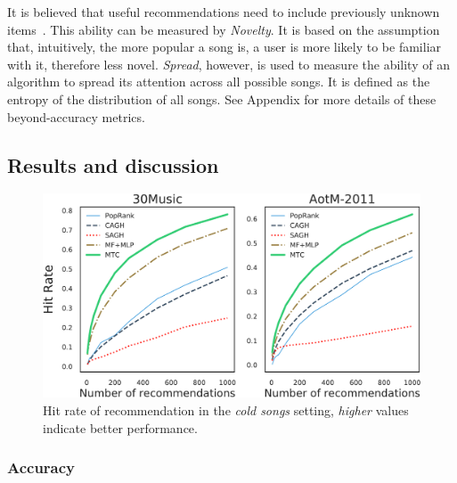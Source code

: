 It is believed that
useful recommendations need to include previously unknown items~\cite{herlocker2004evaluating,zhang2012auralist}.
This ability can be measured by \emph{Novelty}.
It is based on the assumption that, intuitively, the more popular a song is, 
a user is more likely to be familiar with it, therefore less novel.
%
\emph{Spread}, however, is used to measure the ability of an algorithm to spread its attention across all possible songs.
It is defined as the entropy of the distribution of all songs.
See Appendix for more details of these beyond-accuracy metrics.


\subsection{Results and discussion}

\begin{figure}[!t]
    \centering
    \includegraphics[width=\columnwidth]{fig/hr1.pdf}
    \caption{Hit rate of recommendation in the \emph{cold songs} setting,
\emph{higher} values indicate better performance.}
    \label{fig:hr1}
\end{figure}



\subsubsection{Accuracy}


